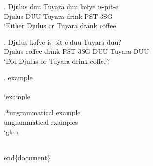 \documentclass{article}
\begin{document}
\exg. Djulus duu Tuyara duu kofye is-pit-e\\
Djulus DUU Tuyara drink-PST-3SG\\
`Either Djulus or Tuyara drank coffee

\exg. Djulus kofye is-pit-e duu Tuyara duu?\\
Djulus coffee drink-PST-3SG DUU Tuyara DUU\\
`Did Djulus or Tuyara drink coffee?

\exg. example\\
\\
`example

\exg.*ungrammatical example\\
ungrammatical examples\\
`gloss

\\end\{document\}
\end{document}
